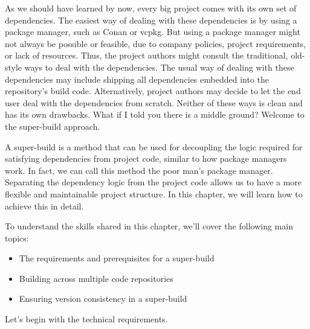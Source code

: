 As we should have learned by now, every big project comes with its own set of dependencies. The easiest way of dealing with these dependencies is by using a package manager, such as Conan or vcpkg. But using a package manager might not always be possible or feasible, due to company policies, project requirements, or lack of resources. Thus, the project authors might consult the traditional, old-style ways to deal with the dependencies. The usual way of dealing with these dependencies may include shipping all dependencies embedded into the repository's build code. Alternatively, project authors may decide to let the end user deal with the dependencies from scratch. Neither of these ways is clean and has its own drawbacks. What if I told you there is a middle ground? Welcome to the super-build approach.

A super-build is a method that can be used for decoupling the logic required for satisfying dependencies from project code, similar to how package managers work. In fact, we can call this method the poor man's package manager. Separating the dependency logic from the project code allows us to have a more flexible and maintainable project structure. In this chapter, we will learn how to achieve this in detail.

To understand the skills shared in this chapter, we'll cover the following main topics:

\begin{itemize}
\item 
The requirements and prerequisites for a super-build

\item 
Building across multiple code repositories

\item 
Ensuring version consistency in a super-build
\end{itemize}

Let's begin with the technical requirements.

















